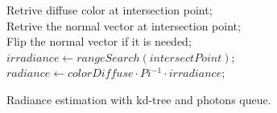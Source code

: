 \begin{algorithm}[H]
	\SetAlgoLined
	
	 {
		Retrive diffuse color at intersection point; \\
		Retrive the normal vector at intersection point; \\
		Flip the normal vector if it is needed; \\ 
		\( irradiance \leftarrow rangeSearch(intersectPoint) \); \\
		\( radiance \leftarrow colorDiffuse \cdot Pi^{-1} \cdot irradiance \); 	
	}
	\caption{Radiance estimation with kd-tree and photons queue.} 	
	\label{algo:render_kdleaf_photons} 
\end{algorithm}

